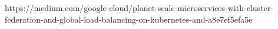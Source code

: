 https://medium.com/google-cloud/planet-scale-microservices-with-cluster-federation-and-global-load-balancing-on-kubernetes-and-a8e7ef5efa5e

